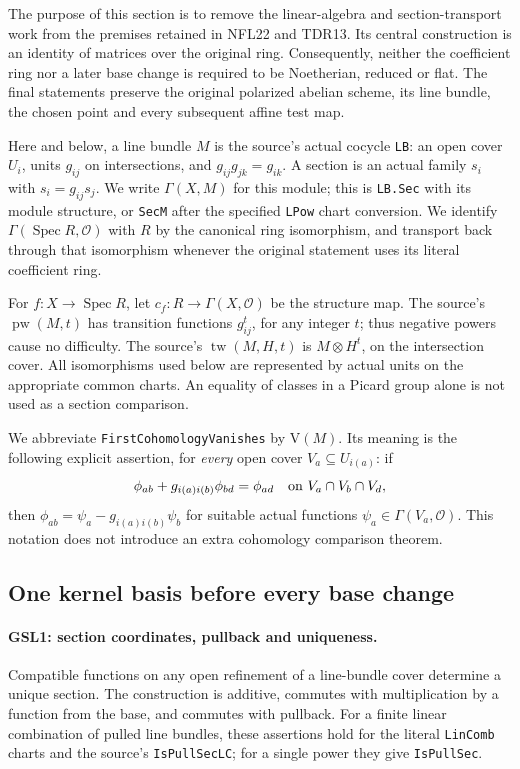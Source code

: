 \documentclass[11pt,a4paper]{article}
\numberwithin{equation}{section}
\theoremstyle{remark}\newtheorem{remark}[theorem]{Remark}
\begin{document}
The purpose of this section is to remove the linear-algebra and
section-transport work from the premises retained in NFL22 and TDR13.
Its central construction is an identity of matrices over the original
ring.  Consequently, neither the coefficient ring nor a later base
change is required to be Noetherian, reduced or flat.  The final
statements preserve the original polarized abelian scheme, its line
bundle, the chosen point and every subsequent affine test map.

Here and below, a line bundle $M$ is the source's actual cocycle
\texttt{LB}: an open cover $U_i$, units $g_{ij}$ on intersections,
and $g_{ij}g_{jk}=g_{ik}$.  A section is an actual family $s_i$ with
$s_i=g_{ij}s_j$.  We write $\Gamma(X,M)$ for this module; this is
\texttt{LB.\allowbreak Sec} with its module structure, or \texttt{Sec\allowbreak M} after
the specified \texttt{LPow} chart conversion.  We identify
$\Gamma(\operatorname{Spec}R,\mathcal O)$ with $R$ by the canonical
ring isomorphism, and transport back through that isomorphism whenever
the original statement uses its literal coefficient ring.

For $f:X\to\operatorname{Spec}R$, let $c_f:R\to\Gamma(X,\mathcal O)$
be the structure map.  The source's $\operatorname{pw}(M,t)$ has
transition functions $g_{ij}^{t}$, for any integer $t$; thus negative
powers cause no difficulty.  The source's
$\operatorname{tw}(M,H,t)$ is $M\otimes H^t$, on the intersection
cover.  All isomorphisms used below are represented by actual units on
the appropriate common charts.  An equality of classes in a Picard group
alone is not used as a section comparison.

We abbreviate \texttt{First\allowbreak Cohomology\allowbreak Vanishes} by $\mathrm{V}(M)$.
Its meaning is the following explicit assertion, for \emph{every}
open cover $V_a\subseteq U_{i(a)}$: if
\[
 \phi_{ab}+g_{i(a)i(b)}\phi_{bd}=\phi_{ad}
 \quad\hbox{on }V_a\cap V_b\cap V_d,
\]
then $\phi_{ab}=\psi_a-g_{i(a)i(b)}\psi_b$ for suitable actual
functions $\psi_a\in\Gamma(V_a,\mathcal O)$.  This notation does
not introduce an extra cohomology comparison theorem.

\subsection{One kernel basis before every base change}

\paragraph{GSL1: section coordinates, pullback and uniqueness.}
\label{claim:GSL1}
Compatible functions on any open refinement of a line-bundle cover
determine a unique section.  The construction is additive, commutes with
multiplication by a function from the base, and commutes with pullback.
For a finite linear combination of pulled line bundles, these assertions
hold for the literal \texttt{Lin\allowbreak Comb} charts and the source's
\texttt{Is\allowbreak Pull\allowbreak Sec\allowbreak LC}; for a single power they give \texttt{Is\allowbreak Pull\allowbreak Sec}.
\end{document}
